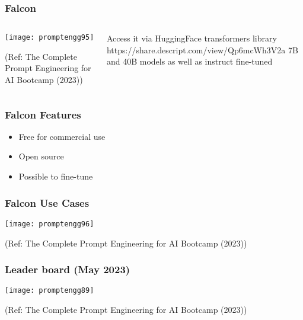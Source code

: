 \begin{frame}[fragile]\frametitle{Falcon}


\begin{columns}
    \begin{column}[T]{0.6\linewidth}
		\begin{center}
		\texttt{[image: promptengg95]}

		{\tiny (Ref: The Complete Prompt Engineering for AI Bootcamp (2023))}
		\end{center}	
    \end{column}
    \begin{column}[T]{0.4\linewidth}
		Access it via HuggingFace transformers library https://share.descript.com/view/Qp6mcWh3V2a
		7B and 40B models as well as instruct fine-tuned
    \end{column}
  \end{columns}
\end{frame}


\begin{frame}[fragile]\frametitle{Falcon Features}

\begin{itemize}
\item Free for commercial use
\item Open source
\item Possible to fine-tune
\end{itemize}	 

\end{frame}

\begin{frame}[fragile]\frametitle{Falcon Use Cases}


		\begin{center}
		\texttt{[image: promptengg96]}

		{\tiny (Ref: The Complete Prompt Engineering for AI Bootcamp (2023))}
		\end{center}	

\end{frame}









\begin{frame}[fragile]\frametitle{Leader board (May 2023)}


		\begin{center}
		\texttt{[image: promptengg89]}

		{\tiny (Ref: The Complete Prompt Engineering for AI Bootcamp (2023))}
		\end{center}	

\end{frame}